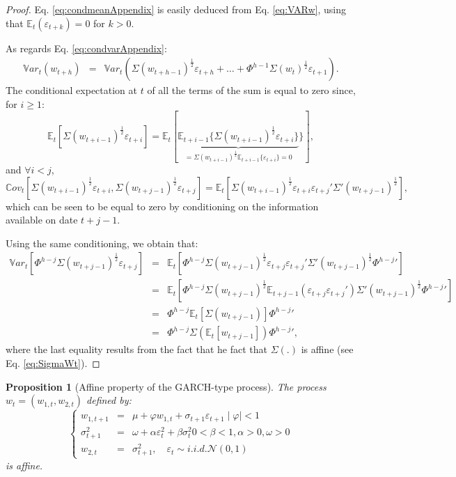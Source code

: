 \documentclass[
  12pt,
]{book}
\newtheorem{proposition}{Proposition}[chapter]
\theoremstyle{definition}
\theoremstyle{definition}
\theoremstyle{definition}
\theoremstyle{definition}
\theoremstyle{remark}
\begin{document}
\begin{proof}
Eq. \eqref{eq:condmeanAppendix} is easily deduced from Eq. \eqref{eq:VARw}, using that \(\mathbb{E}_t(\varepsilon_{t+k})=0\) for \(k>0\).

As regards Eq. \eqref{eq:condvarAppendix}:
\begin{eqnarray*}
\mathbb{V}ar_t(w_{t+h}) &=& \mathbb{V}ar_t\left(\Sigma(w_{t+h-1})^{\frac{1}{2}}\varepsilon_{t+h}+\dots + \Phi^{h-1} \Sigma(w_{t})^{\frac{1}{2}}\varepsilon_{t+1} \right).
\end{eqnarray*}
The conditional expectation at \(t\) of all the terms of the sum is equal to zero since, for \(i \ge 1\):
\[
\mathbb{E}_t\left[\Sigma(w_{t+i-1})^{\frac{1}{2}}\varepsilon_{t+i}\right] = \mathbb{E}_t[\underbrace{\mathbb{E}_{t+i-1}\{\Sigma(w_{t+i-1})^{\frac{1}{2}}\varepsilon_{t+i}\}}_{=\Sigma(w_{t+i-1})^{\frac{1}{2}}\mathbb{E}_{t+i-1}\{\varepsilon_{t+i}\}=0}\}],
\]
and \(\forall i <j\),
\[
\mathbb{C}ov_t\left[\Sigma(w_{t+i-1})^{\frac{1}{2}}\varepsilon_{t+i},\Sigma(w_{t+j-1})^{\frac{1}{2}}\varepsilon_{t+j}\right] = \mathbb{E}_t\left[\Sigma(w_{t+i-1})^{\frac{1}{2}}\varepsilon_{t+i}\varepsilon_{t+j}'\Sigma'(w_{t+j-1})^{\frac{1}{2}}\right],
\]
which can be seen to be equal to zero by conditioning on the information available on date \(t+j-1\).

Using the same conditioning, we obtain that:
\begin{eqnarray*}
\mathbb{V}ar_t\left[\Phi^{h-j}\Sigma(w_{t+j-1})^{\frac{1}{2}}\varepsilon_{t+j}\right] &=& \mathbb{E}_t\left[\Phi^{h-j}\Sigma(w_{t+j-1})^{\frac{1}{2}}\varepsilon_{t+j}\varepsilon_{t+j}'\Sigma'(w_{t+j-1})^{\frac{1}{2}}{\Phi^{h-j}}'\right] \\
&=&  \mathbb{E}_t\left[\Phi^{h-j}\Sigma(w_{t+j-1})^{\frac{1}{2}} \mathbb{E}_{t+j-1}(\varepsilon_{t+j}\varepsilon_{t+j}')\Sigma'(w_{t+j-1})^{\frac{1}{2}}{\Phi^{h-j}}'\right] \\
&=&  \Phi^{h-j}\mathbb{E}_t[\Sigma(w_{t+j-1})]{\Phi^{h-j}}' \\
&=&  \Phi^{h-j}\Sigma(\mathbb{E}_t[w_{t+j-1}]){\Phi^{h-j}}',
\end{eqnarray*}
where the last equality results from the fact that he fact that \(\Sigma(.)\) is affine (see Eq. \eqref{eq:SigmaWt}).
\end{proof}

\begin{proposition}[Affine property of the GARCH-type process]
\protect\hypertarget{prp:GARCH}{}\label{prp:GARCH}The process \(w_t = (w_{1,t}, w_{2,t})\) defined by:
\[
\left\{
\begin{array}{ccl}
w_{1, t+1} &=& \mu + \varphi w_{1,t} + \sigma_{t+1} \varepsilon_{t+1}    \mid \varphi \mid < 1 \\
\sigma^2_{t+1} &=& \omega + \alpha \varepsilon^2_t + \beta \sigma^2_t      0 < \beta < 1, \alpha > 0, \omega > 0    \\
w_{2,t} &=& \sigma^2_{t+1}, \quad \varepsilon_t \sim   i.i.d.   \mathcal{N}(0,1)
\end{array}
\right.
\]
is affine.
\end{proposition}
\end{document}
